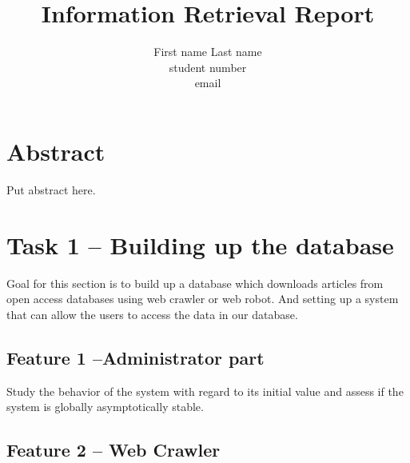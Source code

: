 \documentclass[a4paper]{article} %
\begin{document}

\title{Information Retrieval Report}
\author{First name Last name \\ student number \\ email} 

\maketitle                     %





\section*{Abstract}
\label{abstract}

Put abstract here.


\section*{Task 1 -- Building up the database}
\label{task1}

Goal for this section is to build up a database which downloads articles from open access databases using web crawler or web robot. And setting up a system that can allow the users to access the data in our database.

\subsection*{Feature 1 --Administrator part}
\label{task1:feature1}

Study the behavior of the system with regard to its initial value and assess if the system is globally asymptotically stable.

\subsection*{Feature 2 -- Web Crawler}
\label{task1:feature2}
\end{document}
